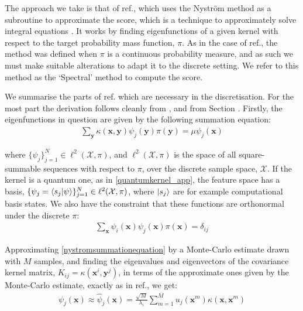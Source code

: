 The approach we take is that of ref., which uses the Nystr{\"o}m method as a subroutine to approximate the score, which is a technique to approximately solve integral equations . It works by finding eigenfunctions of a given kernel with respect to the target probability mass function, $\pi$. As in the case of ref., the method was defined when $\pi$ is a continuous probability measure, and as such we must make suitable alterations to adapt it to the discrete setting. We refer to this method as the `Spectral' method to compute the score. 

We summarise the parts of ref. which are necessary in the discretisation. For the most part the derivation follows cleanly from , and from Section . Firstly, the eigenfunctions in question are given by the following summation equation:
\begin{align}
    \sum_{\mathbf{y}}\kappa(\mathbf{x}, \mathbf{y})\psi_j(\mathbf{y})\pi(\mathbf{y}) = \mu \psi_j(\mathbf{x}) \label{nystromsummationequation}
\end{align}

where $\{\psi_j\}_{j= 1}^N \in \ell^2(\mathcal{X}, \pi)$, and $\ell^2(\mathcal{X}, \pi)$ is the space of all square-summable sequences with respect to $\pi$, over the discrete sample space, $\mathcal{X}$. If the kernel is a quantum one, as in \eqref{quantumkernel_app}, the feature space has a basis, $\{\psi_j = \braket{s_j|\psi}\}_{j= 1}^N \in \ell^2(\mathcal{X}, \pi)$, where $\ket{s_j}$ are for example computational basis states. We also have the constraint that these functions are orthonormal under the discrete $\pi$:
\begin{align}
    \sum_{\mathbf{x}}\psi_i(\mathbf{x})\psi_j(\mathbf{x}) \pi(\mathbf{x}) = \delta_{ij} \label{nystromorthomal}
\end{align}


Approximating \eqref{nystromsummationequation} by a Monte-Carlo estimate drawn with $M$ samples, and finding the eigenvalues and eigenvectors of the covariance kernel matrix, $K_{ij} = \kappa(\mathbf{x}^i, \mathbf{y}^j)$, in terms of the approximate ones given by the Monte-Carlo estimate, exactly as in ref., we get:
\begin{align}
    \psi_j(\mathbf{x}) \approx \hat{\psi}_j(\mathbf{x}) = \frac{\sqrt{M}}{\lambda_i}\sum\limits_{m = 1}^M u_j(\mathbf{x}^m)\kappa(\mathbf{x}, \mathbf{x}^m) \label{nystromeigenfunctions}
\end{align}


